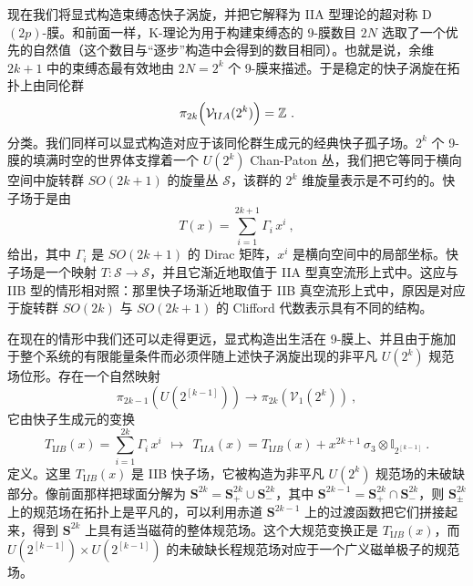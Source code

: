 \documentclass[11pt,a4paper]{ctexart}
\begin{document}
现在我们将显式构造束缚态快子涡旋，并把它解释为 IIA 型理论的超对称 D\((2p)\)-膜。和前面一样，K-理论为用于构建束缚态的 9-膜数目 \(2N\) 选取了一个优先的自然值（这个数目与``逐步''构造中会得到的数目相同）。也就是说，余维 \(2k+1\) 中的束缚态最有效地由 \(2N=2^k\) 个 9-膜来描述。于是稳定的快子涡旋在拓扑上由同伦群 \[\pi_{2k}\Bigl({\mathcal V}_{\mathrm IIA}(2^k)\Bigr)= {\mathbb{Z}}\ .\] 分类。我们同样可以显式构造对应于该同伦群生成元的经典快子孤子场。\(2^k\) 个 9-膜的填满时空的世界体支撑着一个 \(U(2^k)\) Chan-Paton 丛，我们把它等同于横向空间中旋转群 \(SO(2k+1)\) 的旋量丛 \({\mathcal S}\)，该群的 \(2^k\) 维旋量表示是不可约的。快子场于是由 \[T(x)=\sum_{i=1}^{2k+1}\Gamma_i\, x^i\ ,\] 给出，其中 \(\Gamma_i\) 是 \(SO(2k+1)\) 的 Dirac 矩阵，\(x^i\) 是横向空间中的局部坐标。快子场是一个映射 \(T: {\mathcal S}\rightarrow{\mathcal S}\)，并且它渐近地取值于 IIA 型真空流形上式中。这应与 IIB 型的情形相对照：那里快子场渐近地取值于 IIB 真空流形上式中，原因是对应于旋转群 \(SO(2k)\) 与 \(SO(2k+1)\) 的 Clifford 代数表示具有不同的结构。

在现在的情形中我们还可以走得更远，显式构造出生活在 9-膜上、并且由于施加于整个系统的有限能量条件而必须伴随上述快子涡旋出现的非平凡 \(U(2^k)\) 规范场位形。存在一个自然映射 \[\pi_{2k-1}\left(U(2^[k-1])\right)\longrightarrow
\pi_{2k}\left({\mathcal V}_{1}(2^k)\right)\ ,\] 它由快子生成元的变换 \[T_{\mathrm IIB}(x)=\sum_{i=1}^{2k}\Gamma_i\,x^i~~\longmapsto~~
T_{\mathrm IIA}(x)=T_{\mathrm IIB}(x)+x^{2k+1}\,\sigma_3\otimes{\mathbb{I}}_{2^[k-1]}\ .\] 定义。这里 \(T_{\mathrm IIB}(x)\) 是 IIB 快子场，它被构造为非平凡 \(U(2^k)\) 规范场的未破缺部分。像前面那样把球面分解为 \({\mathbf S}^{2k}={\mathbf S}_+^{2k}\cup {\mathbf S}_-^{2k}\)，其中 \({\mathbf S}^{2k-1}={\mathbf S}_+^{2k}\cap {\mathbf S}_-^{2k}\)，则 \({\mathbf S}_{\pm}^{2k}\) 上的规范场在拓扑上是平凡的，可以利用赤道 \({\mathbf S}^{2k-1}\) 上的过渡函数把它们拼接起来，得到 \({\mathbf S}^{2k}\) 上具有适当磁荷的整体规范场。这个大规范变换正是 \(T_{\mathrm IIB}(x)\)，而 \(U(2^[k-1])\times U(2^[k-1])\) 的未破缺长程规范场对应于一个广义磁单极子的规范场。
\end{document}
